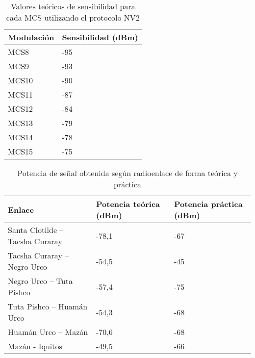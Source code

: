 \begin{table}[H]
	\begin{center}
		\begin{tabular}{|l|l|}
			\hline
			Modulación & Sensibilidad (dBm)\\
			\hline 
			MCS8 & -95 \\ \hline
			MCS9 & -93 \\ \hline
			MCS10 & -90 \\ \hline
			MCS11 & -87 \\ \hline
			MCS12 & -84 \\ \hline
			MCS13 & -79 \\ \hline
			MCS14 & -78 \\ \hline
			MCS15 & -75 \\ \hline
		\end{tabular}
	\end{center}
	\caption{Valores teóricos de sensibilidad para cada MCS utilizando el protocolo NV2}
	\label{table:sensibilidadMCS}
\end{table}


\begin{table}[H]
	\begin{center}
		\begin{tabular}{|l|l|l|}
			\hline
			Enlace & Potencia teórica (dBm) & Potencia práctica (dBm)\\
			\hline 
		Santa Clotilde – Tacsha Curaray & -78,1 & -67 \\ \hline
		Tacsha Curaray – Negro Urco & -54,5 & -45 \\ \hline
		Negro Urco – Tuta Pishco & -57,4 & -75  \\ \hline
		Tuta Pishco – Huamán Urco & -54,3 & -68 \\ \hline
		Huamán Urco – Mazán & -70,6 & -68 \\ \hline
		Mazán - Iquitos & -49,5 & -66 \\ \hline
		\end{tabular}
	\end{center}
	\caption{Potencia de señal obtenida según radioenlace de forma teórica y práctica}
	\label{table:sensibilidadCampoObtenida}
\end{table}

